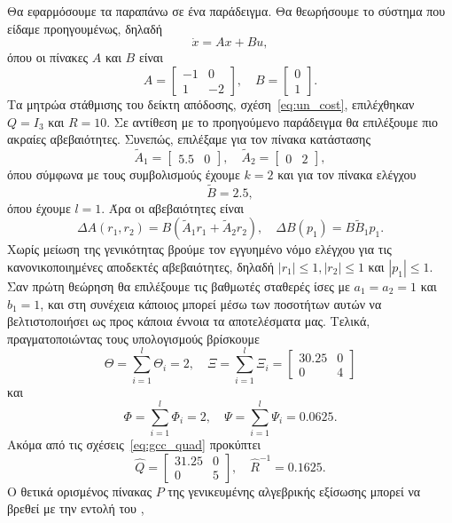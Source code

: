 Θα εφαρμόσουμε τα παραπάνω σε ένα παράδειγμα. Θα θεωρήσουμε το σύστημα που
είδαμε προηγουμένως, δηλαδή
\[
    \dot{x} = Ax + Bu,
\]
όπου οι πίνακες \( A \) και \( B \) είναι
\[
    A =
    \begin{bmatrix}
        -1 & 0 \\
        1 & -2
    \end{bmatrix}, \quad
    B = \begin{bmatrix}0 \\ 1\end{bmatrix}.
\]
Τα μητρώα στάθμισης του δείκτη απόδοσης, σχέση~\eqref{eq:un_cost}, επιλέχθηκαν
\( Q = I_3 \) και \( R = 10 \). Σε αντίθεση με το προηγούμενο παράδειγμα θα
επιλέξουμε πιο ακραίες αβεβαιότητες. Συνεπώς, επιλέξαμε για τον πίνακα
κατάστασης
\[
    \tilde{A}_1 = \begin{bmatrix}5.5 & 0\end{bmatrix},\quad
    \tilde{A}_2 = \begin{bmatrix}0 & 2\end{bmatrix},
\]
όπου σύμφωνα με τους συμβολισμούς έχουμε \( k = 2 \) και για τον πίνακα ελέγχου
\[
    \tilde{B} = 2.5,
\]
όπου έχουμε \( l = 1 \). Άρα οι αβεβαιότητες είναι
\[
    \Delta A(r_1, r_2) =
    B\left(\tilde{A}_1r_1 + \tilde{A}_2r_2\right), \quad
    \Delta B(p_1) = B\tilde{B}_1p_1.
\]
Χωρίς μείωση της γενικότητας βρούμε τον εγγυημένο νόμο ελέγχου για τις
κανονικοποιημένες αποδεκτές αβεβαιότητες, δηλαδή \( |r_1| \leq 1, |r_2| \leq 1
\) και \( |p_1| \leq 1 \). Σαν πρώτη θεώρηση θα επιλέξουμε τις βαθμωτές σταθερές
ίσες με \( a_1 = a_2 = 1 \) και \( b_1 = 1 \), και στη συνέχεια κάποιος μπορεί
μέσω των ποσοτήτων αυτών να βελτιστοποιήσει ως προς κάποια έννοια τα αποτελέσματα μας.
Τελικά, πραγματοποιώντας τους υπολογισμούς βρίσκουμε
\[
    \Theta = \sum_{i = 1}^l\Theta_i = 2, \quad
    \Xi = \sum_{i = 1}^l\Xi_i =
    \begin{bmatrix}
        30.25 & 0 \\
         0 & 4
     \end{bmatrix}
\]
και
\[
    \Phi = \sum_{i = 1}^l\Phi_i = 2,\quad
    \Psi = \sum_{i = 1}^l\Psi_i = 0.0625.
\]
Ακόμα από τις σχέσεις~\eqref{eq:gcc_quad} προκύπτει
\[
    \hat{Q} =
    \begin{bmatrix}
        31.25 & 0 \\
         0 & 5
     \end{bmatrix}, \quad
     \hat{R}^{-1} = 0.1625.
\]
Ο θετικά ορισμένος πίνακας \( P \) της γενικευμένης αλγεβρικής εξίσωσης
 μπορεί να βρεθεί με την εντολή  του ,
